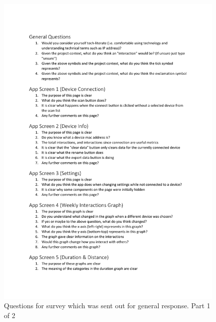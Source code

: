 \documentclass{l4proj}
\begin{document}
\begin{appendices}
    \begin{figure}[!htb]
        \centering
        \includegraphics[width=1.0\linewidth]{images/non-contact_survey_questions 1.pdf}

        \caption{ Questions for survey which was sent out for general response. Part 1 of 2 }

        \label{fig:non-contact-survey-questions-1}
    \end{figure}


\end{appendices}
\end{document}
